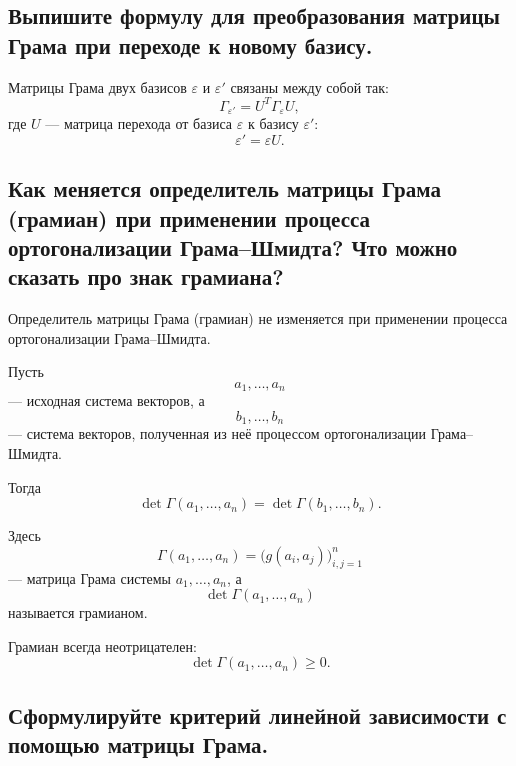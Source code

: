 \subsection{Выпишите формулу для преобразования матрицы Грама при переходе к новому базису.}

\begin{theorem}
    Матрицы Грама двух базисов $\varepsilon$ и $\varepsilon'$ связаны между собой так:
    \[
        \Gamma_{\varepsilon'} = U^T \Gamma_{\varepsilon} U,
    \]
    где $U$ --- матрица перехода от базиса $\varepsilon$ к базису $\varepsilon'$:
    \[
        \varepsilon' = \varepsilon U.
    \]
\end{theorem}


\subsection{Как меняется определитель матрицы Грама (грамиан) при применении процесса ортогонализации Грама--Шмидта? Что можно сказать про знак грамиана?}

\begin{theorem}
    Определитель матрицы Грама (грамиан) не изменяется при применении процесса ортогонализации Грама--Шмидта.
\end{theorem}

\begin{remark}
    Пусть
    \[
        a_1, \ldots, a_n
    \]
    --- исходная система векторов, а
    \[
        b_1, \ldots, b_n
    \]
    --- система векторов, полученная из неё процессом ортогонализации Грама--Шмидта.
    
    Тогда
    \[
        \det \Gamma(a_1, \ldots, a_n)
        =
        \det \Gamma(b_1, \ldots, b_n).
    \]
\end{remark}

\begin{remark}
    Здесь
    \[
        \Gamma(a_1, \ldots, a_n)
        =
        \bigl(g(a_i, a_j)\bigr)_{i,j=1}^{n}
    \]
    --- матрица Грама системы $a_1, \ldots, a_n$,
    а
    \[
        \det \Gamma(a_1, \ldots, a_n)
    \]
    называется грамианом.
\end{remark}

\begin{remark}
    Грамиан всегда неотрицателен:
    \[
        \det \Gamma(a_1, \ldots, a_n) \geq 0.
    \]
\end{remark}


\subsection{Сформулируйте критерий линейной зависимости с помощью матрицы Грама.}

